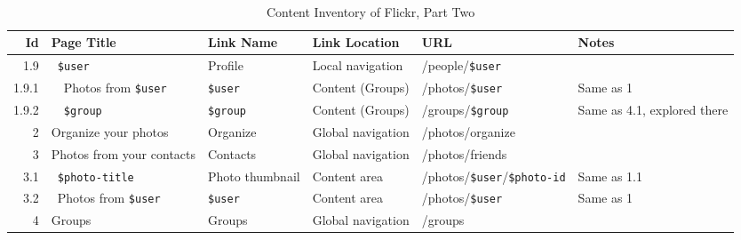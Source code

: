 \documentclass[11pt,a4paper]{article}
\newcommand{\var}[1]{\texttt{\${#1}}}
\begin{document}
%
%

\begin{landscape}
  \begin{table}[h!b!p!]
    \caption{Content Inventory of Flickr, Part Two}
    \label{table:flickr.content.inventory.2}
    \begin{center}
      \begin{tiny}
        \tt
        \begin{tabular}{r|l|l|l|l|p{3cm}}
            Id &
            Page Title &
            Link Name &
            Link Location &
            URL &
            Notes \\

            \hline

              1.9 &
              ~\var{user} &
              Profile &
              Local navigation &
              /people/\var{user} &
              \\

                1.9.1 &
                ~~Photos from \var{user} &
                \var{user} &
                Content (Groups) &
                /photos/\var{user} &
                Same as 1 \\

                1.9.2 &
                ~~\var{group} &
                \var{group} &
                Content (Groups) &
                /groups/\var{group} &
                Same as 4.1, explored there \\

            2 &
            Organize your photos &
            Organize &
            Global navigation &
            /photos/organize &
            \\

            3 &
            Photos from your contacts &
            Contacts &
            Global navigation &
            /photos/friends &
            \\

              3.1 &
              ~\var{photo-title} &
              Photo thumbnail &
              Content area &
              /photos/\var{user}/\var{photo-id} &
              Same as 1.1 \\

              3.2 &
              ~Photos from \var{user} &
              \var{user} &
              Content area &
              /photos/\var{user} &
              Same as 1 \\

            4 &
            Groups &
            Groups &
            Global navigation &
            /groups &
            \\


\end{tabular}
\end{tiny}
\end{center}
\end{table}
\end{landscape}
\end{document}
